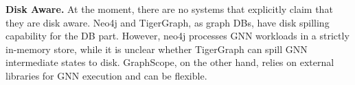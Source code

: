 \vspace{2mm}
\noindent \textbf{Disk Aware.} At the moment, there are no systems that explicitly claim that they are disk aware. Neo4j and TigerGraph, as graph DBs, have disk spilling capability for the DB part. However, neo4j processes GNN workloads in a strictly in-memory store, while it is unclear whether TigerGraph can spill GNN intermediate states to disk. GraphScope, on the other hand, relies on external libraries for GNN execution and can be flexible.





